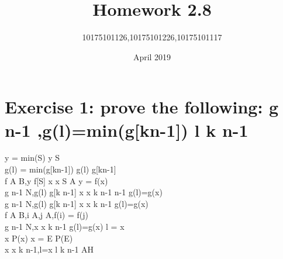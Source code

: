 \documentclass[11pt,a4paper,fleqn]{article}
\title{Homework  2.8}
\author{10175101126,10175101226,10175101117}
\date{April 2019}
\begin{document}
\maketitle

\section{Exercise 1: prove the following:  g  \upto n-1 \rightarrow {},g(l)=min(g[k\upto n-1]) \vdash l \in k \upto n-1} 
\noindent
y = min(S) \vdash y \in S \\
g(l) = min(g[k\upto n-1]) \vdash g(l) \in g[k\upto n-1] \\
f \in A \rightarrow B,y \in f[S] \vdash \exists x \cdot x \in S \cap A \wedge y = f(x) \\
g  \upto n-1 \rightarrow N,g(l) \in g[k \upto n-1] \vdash \exists x \cdot x \in k \upto n-1  \upto n-1 \wedge g(l)=g(x) \\
g  \upto n-1 \rightarrow N,g(l) \in g[k \upto n-1] \vdash \exists x \cdot x \in k \upto n-1 \wedge g(l)=g(x) \\
f \in A \rightarrowtail B,i \in A,j \in A,f(i) = f(j) \\
g  \upto n-1 \rightarrowtail N,\exists x \cdot x \in k \upto n-1 \wedge g(l)=g(x) \vdash l = x \\
\exists x \cdot P(x) \wedge x = E \vdash P(E) \\
\exists x \cdot x \in k \upto n-1,l=x \vdash l \in k \upto n-1 \; AH \\
\end{document}
